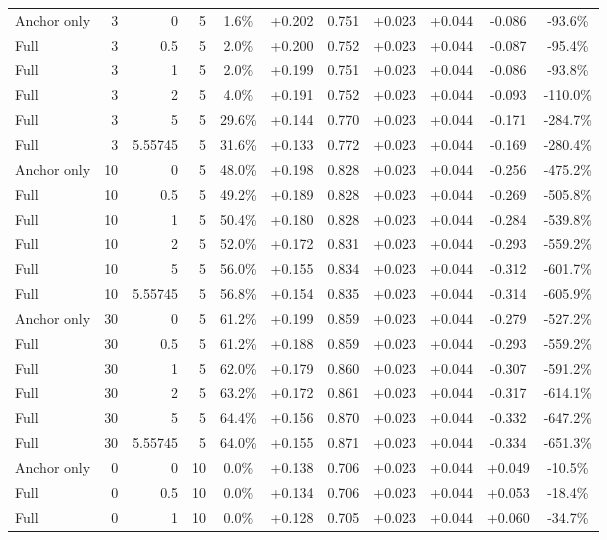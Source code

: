 \begin{table}[htbp]
\begin{tabular}{lrrrccccccc}
Anchor only & 3 & 0 & 5 & 1.6\% & +0.202 & 0.751 & +0.023 & +0.044 & -0.086 & -93.6\% \\
Full & 3 & 0.5 & 5 & 2.0\% & +0.200 & 0.752 & +0.023 & +0.044 & -0.087 & -95.4\% \\
Full & 3 & 1 & 5 & 2.0\% & +0.199 & 0.751 & +0.023 & +0.044 & -0.086 & -93.8\% \\
Full & 3 & 2 & 5 & 4.0\% & +0.191 & 0.752 & +0.023 & +0.044 & -0.093 & -110.0\% \\
Full & 3 & 5 & 5 & 29.6\% & +0.144 & 0.770 & +0.023 & +0.044 & -0.171 & -284.7\% \\
Full & 3 & 5.55745 & 5 & 31.6\% & +0.133 & 0.772 & +0.023 & +0.044 & -0.169 & -280.4\% \\
Anchor only & 10 & 0 & 5 & 48.0\% & +0.198 & 0.828 & +0.023 & +0.044 & -0.256 & -475.2\% \\
Full & 10 & 0.5 & 5 & 49.2\% & +0.189 & 0.828 & +0.023 & +0.044 & -0.269 & -505.8\% \\
Full & 10 & 1 & 5 & 50.4\% & +0.180 & 0.828 & +0.023 & +0.044 & -0.284 & -539.8\% \\
Full & 10 & 2 & 5 & 52.0\% & +0.172 & 0.831 & +0.023 & +0.044 & -0.293 & -559.2\% \\
Full & 10 & 5 & 5 & 56.0\% & +0.155 & 0.834 & +0.023 & +0.044 & -0.312 & -601.7\% \\
Full & 10 & 5.55745 & 5 & 56.8\% & +0.154 & 0.835 & +0.023 & +0.044 & -0.314 & -605.9\% \\
Anchor only & 30 & 0 & 5 & 61.2\% & +0.199 & 0.859 & +0.023 & +0.044 & -0.279 & -527.2\% \\
Full & 30 & 0.5 & 5 & 61.2\% & +0.188 & 0.859 & +0.023 & +0.044 & -0.293 & -559.2\% \\
Full & 30 & 1 & 5 & 62.0\% & +0.179 & 0.860 & +0.023 & +0.044 & -0.307 & -591.2\% \\
Full & 30 & 2 & 5 & 63.2\% & +0.172 & 0.861 & +0.023 & +0.044 & -0.317 & -614.1\% \\
Full & 30 & 5 & 5 & 64.4\% & +0.156 & 0.870 & +0.023 & +0.044 & -0.332 & -647.2\% \\
Full & 30 & 5.55745 & 5 & 64.0\% & +0.155 & 0.871 & +0.023 & +0.044 & -0.334 & -651.3\% \\
Anchor only & 0 & 0 & 10 & 0.0\% & +0.138 & 0.706 & +0.023 & +0.044 & +0.049 & -10.5\% \\
Full & 0 & 0.5 & 10 & 0.0\% & +0.134 & 0.706 & +0.023 & +0.044 & +0.053 & -18.4\% \\
Full & 0 & 1 & 10 & 0.0\% & +0.128 & 0.705 & +0.023 & +0.044 & +0.060 & -34.7\% \\

\end{tabular}
\end{table}
